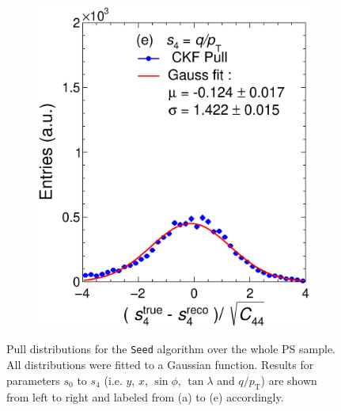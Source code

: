\begin{figure}[t]
\begin{subfigure}{0.32\textwidth}
         \includegraphics[width=\textwidth]{figures/ch5-KF_NDGAr/FullSample/Int/Units/IdealUnit4Seed.eps}
         \caption{}
         \label{fig:resp4SeedGAr_IntI}
     \end{subfigure}
        \caption{Pull distributions for the \texttt{Seed} algorithm over the whole PS sample. All distributions were fitted to a Gaussian function. Results for parameters $s_0$ to $s_4$ (i.e. $y$, $x$, $\sin\phi$, $\tan\lambda$ and $q/p_{\text{T}}$) are shown from left to right and labeled from (a) to (e) accordingly. }
        \label{fig:UnitGAr_IntI}
\end{figure}

